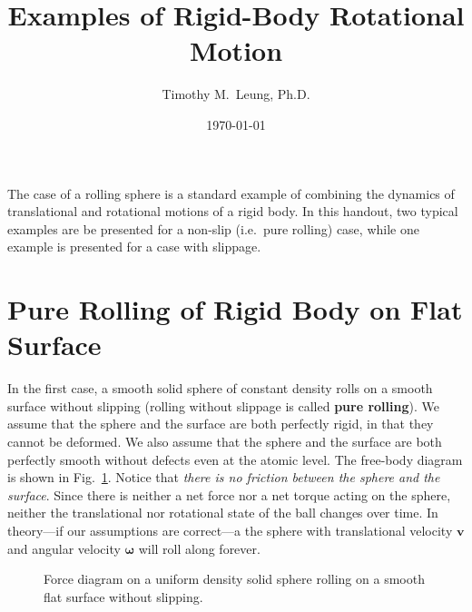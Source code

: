 \documentclass[11pt]{article}
\title{Examples of Rigid-Body Rotational Motion}
\author{Timothy M.\ Leung, Ph.D.}
\date{\today}
\newcommand{\mb}[1]{\mathbf{#1}}
\begin{document}
\maketitle

The case of a rolling sphere is a standard example of combining the dynamics of
translational and rotational motions of a rigid body. In this handout, two
typical examples are be presented for a non-slip (i.e.\ pure rolling) case,
while one example is presented for a case with slippage.

\section{Pure Rolling of Rigid Body on Flat Surface}
\label{no-slip-ball}
In the first case, a smooth solid sphere of constant density rolls on a smooth
surface without slipping (rolling without slippage is called
\textbf{pure rolling}). We assume that the sphere and the surface are both
perfectly rigid, in that they cannot be deformed. We also assume that the sphere
and the surface are both perfectly smooth without defects even at the atomic
level. The free-body diagram is shown in Fig.~\ref{roll-flat}. Notice that
\emph{there is no friction between the sphere and the surface}. Since there is
neither a net force nor a net torque acting on the sphere, neither the
translational nor rotational state of the ball changes over time. In
theory---if our assumptions are correct---a the sphere with translational
velocity $\mb{v}$ and angular velocity $\bm{\omega}$ will roll along forever.
\begin{figure}[!ht]
  \centering
  \caption{Force diagram on a uniform density solid sphere rolling on a smooth
    flat surface without slipping.}
  \label{roll-flat}
\end{figure}
\end{document}
